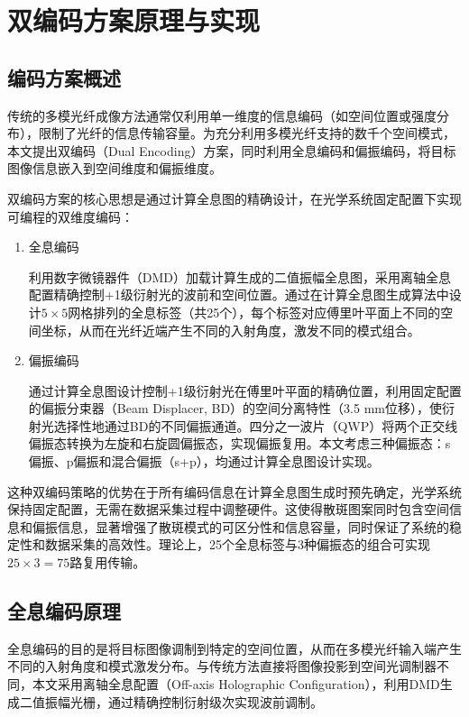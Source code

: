 {\section{双编码方案原理与实现}\label{sec:dual_encoding}

\subsection{编码方案概述}\label{sec:encoding_overview}

传统的多模光纤成像方法通常仅利用单一维度的信息编码（如空间位置或强度分布），限制了光纤的信息传输容量。为充分利用多模光纤支持的数千个空间模式，本文提出双编码（Dual Encoding）方案，同时利用全息编码和偏振编码，将目标图像信息嵌入到空间维度和偏振维度。

双编码方案的核心思想是通过计算全息图的精确设计，在光学系统固定配置下实现可编程的双维度编码：
\begin{enumerate}
    \item 全息编码
    
    利用数字微镜器件（DMD）加载计算生成的二值振幅全息图，采用离轴全息配置精确控制+1级衍射光的波前和空间位置。通过在计算全息图生成算法中设计$5\times5$网格排列的全息标签（共25个），每个标签对应傅里叶平面上不同的空间坐标，从而在光纤近端产生不同的入射角度，激发不同的模式组合。
    
    \item 偏振编码
    
    通过计算全息图设计控制+1级衍射光在傅里叶平面的精确位置，利用固定配置的偏振分束器（Beam Displacer, BD）的空间分离特性（3.5 mm位移），使衍射光选择性地通过BD的不同偏振通道。四分之一波片（QWP）将两个正交线偏振态转换为左旋和右旋圆偏振态，实现偏振复用。本文考虑三种偏振态：s偏振、p偏振和混合偏振（s+p），均通过计算全息图设计实现。
\end{enumerate}

这种双编码策略的优势在于所有编码信息在计算全息图生成时预先确定，光学系统保持固定配置，无需在数据采集过程中调整硬件。这使得散斑图案同时包含空间信息和偏振信息，显著增强了散斑模式的可区分性和信息容量，同时保证了系统的稳定性和数据采集的高效性。理论上，25个全息标签与3种偏振态的组合可实现$25 \times 3 = 75$路复用传输。

\subsection{全息编码原理}\label{sec:holographic_encoding}

全息编码的目的是将目标图像调制到特定的空间位置，从而在多模光纤输入端产生不同的入射角度和模式激发分布。与传统方法直接将图像投影到空间光调制器不同，本文采用离轴全息配置（Off-axis Holographic Configuration），利用DMD生成二值振幅光栅，通过精确控制衍射级次实现波前调制。

}

